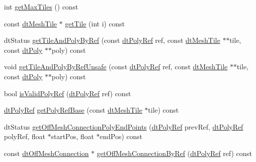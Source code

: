 \begin{Indent}
\begin{DoxyCompactItemize}
\item 
int \hyperlink{classdtNavMesh_a17672fe19464d55eb66dc69f5f2f2b3f}{get\+Max\+Tiles} () const
\item 
const \hyperlink{structdtMeshTile}{dt\+Mesh\+Tile} $\ast$ \hyperlink{classdtNavMesh_a0996a5c5f1028091fe18cd8da019d77e}{get\+Tile} (int i) const
\item 
dt\+Status \hyperlink{classdtNavMesh_a36a84aa7296d5cc257eb3ddc38181253}{get\+Tile\+And\+Poly\+By\+Ref} (const \hyperlink{group__detour_gab4e0b2257a670c1a800057999612b466}{dt\+Poly\+Ref} ref, const \hyperlink{structdtMeshTile}{dt\+Mesh\+Tile} $\ast$$\ast$tile, const \hyperlink{structdtPoly}{dt\+Poly} $\ast$$\ast$poly) const
\item 
void \hyperlink{classdtNavMesh_ac5c5b89a6af63b7de29089ae83091e0f}{get\+Tile\+And\+Poly\+By\+Ref\+Unsafe} (const \hyperlink{group__detour_gab4e0b2257a670c1a800057999612b466}{dt\+Poly\+Ref} ref, const \hyperlink{structdtMeshTile}{dt\+Mesh\+Tile} $\ast$$\ast$tile, const \hyperlink{structdtPoly}{dt\+Poly} $\ast$$\ast$poly) const
\item 
bool \hyperlink{classdtNavMesh_a84ce3e44a2a97c5377b3b308825fcd37}{is\+Valid\+Poly\+Ref} (\hyperlink{group__detour_gab4e0b2257a670c1a800057999612b466}{dt\+Poly\+Ref} ref) const
\item 
\hyperlink{group__detour_gab4e0b2257a670c1a800057999612b466}{dt\+Poly\+Ref} \hyperlink{classdtNavMesh_a0741871ed1357c51e3847f22673fcc9c}{get\+Poly\+Ref\+Base} (const \hyperlink{structdtMeshTile}{dt\+Mesh\+Tile} $\ast$tile) const
\item 
dt\+Status \hyperlink{classdtNavMesh_a5f4c392080406146805f674489feac4a}{get\+Off\+Mesh\+Connection\+Poly\+End\+Points} (\hyperlink{group__detour_gab4e0b2257a670c1a800057999612b466}{dt\+Poly\+Ref} prev\+Ref, \hyperlink{group__detour_gab4e0b2257a670c1a800057999612b466}{dt\+Poly\+Ref} poly\+Ref, float $\ast$start\+Pos, float $\ast$end\+Pos) const
\item 
const \hyperlink{structdtOffMeshConnection}{dt\+Off\+Mesh\+Connection} $\ast$ \hyperlink{classdtNavMesh_a4dec3003fb84ea8f45a2519ec3bc2f0d}{get\+Off\+Mesh\+Connection\+By\+Ref} (\hyperlink{group__detour_gab4e0b2257a670c1a800057999612b466}{dt\+Poly\+Ref} ref) const
\end{DoxyCompactItemize}
\end{Indent}
